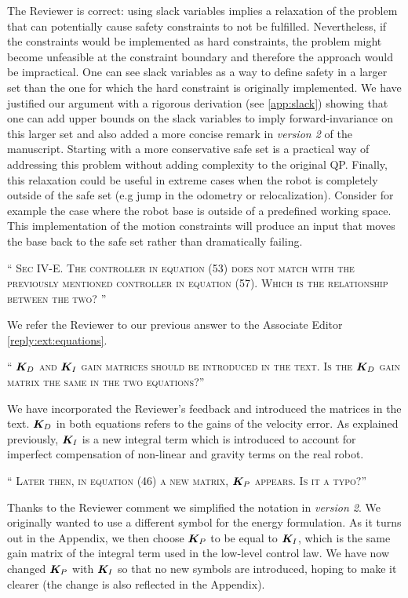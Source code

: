 \documentclass[10pt]{article}
\newcommand{\referee}[1]{\;
  \begin{minipage}[t]{.95\textwidth}
    ``{\small\color{red} \textsc{#1}}''
  \end{minipage}\medskip
  }
\newcommand{\version}[1]{\textit{version #1}}
\begin{document}
\begin{enumerate}[label={[R7:\,\arabic{enumi}]}]
The Reviewer is correct: using slack variables implies a relaxation of the problem that can potentially cause safety constraints to not be fulfilled. Nevertheless, if the constraints would be implemented as hard constraints, the problem might become unfeasible at the constraint boundary and therefore the approach would be impractical. One can see slack variables as a way to define safety in a larger set than the one for which the hard constraint is originally implemented. We have justified our argument with a rigorous
derivation (see \ref{app:slack}) showing that one can add upper bounds on the slack variables to imply forward-invariance on this larger set and also added a more concise remark in \version{2} of the manuscript. Starting with a more conservative safe set is a practical way of addressing this problem without adding complexity to the original QP. Finally, this relaxation could be useful in extreme cases when the robot is completely outside of the safe set (e.g jump in the odometry or relocalization). Consider for example the case where the robot base is outside of a predefined working space. This implementation of the motion constraints will produce an input that moves the base back to the safe set rather than dramatically failing.

\item\label{reply:R7:18} 
\referee{Sec IV-E. The controller in equation (53) does not match with the previously mentioned  controller in equation (57). Which is the relationship between the two? 
}

We refer the Reviewer to our previous answer to the Associate Editor \ref{reply:ext:equations}.

\item\label{reply:R7:19} 
\referee{$\bm{K}_D$ and $\bm{K}_I$ gain matrices should be introduced in the text. Is the $\bm{K}_D$ gain matrix the same in the two equations?}

We have incorporated the Reviewer's feedback and introduced the matrices in the text. $\bm{K}_D$ in both equations refers to the gains of the velocity error. As explained previously, $\bm{K}_I$ is a new integral term which is introduced to account for imperfect compensation of non-linear and gravity terms on the real robot.

\item\label{reply:R7:20} 
\referee{Later then, in equation (46) a new matrix, $\bm{K}_P$ appears. Is it a typo?}

Thanks to the Reviewer comment we simplified the notation in \version{2}. We originally wanted to use a different symbol for the energy formulation. As it turns out in the Appendix, we then choose $\bm{K}_P$ to be equal to $\bm{K}_I$, which is the same gain matrix of the integral term used in the low-level control law. We have now changed $\bm{K}_P$ with $\bm{K}_I$ so that no new symbols are introduced, hoping to make it clearer (the change is also reflected in the Appendix).


\end{enumerate}
\end{document}
